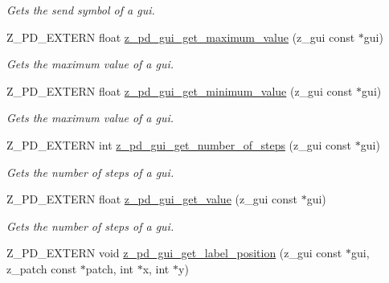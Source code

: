 \begin{DoxyCompactItemize}
\begin{DoxyCompactList}\small\item\em Gets the send symbol of a gui. \end{DoxyCompactList}\item 
\hypertarget{group__zpd_ga71da0fa29b26499035d85b6fde603cc5}{Z\-\_\-\-P\-D\-\_\-\-E\-X\-T\-E\-R\-N float \hyperlink{group__zpd_ga71da0fa29b26499035d85b6fde603cc5}{z\-\_\-pd\-\_\-gui\-\_\-get\-\_\-maximum\-\_\-value} (z\-\_\-gui const $\ast$gui)}\label{group__zpd_ga71da0fa29b26499035d85b6fde603cc5}

\begin{DoxyCompactList}\small\item\em Gets the maximum value of a gui. \end{DoxyCompactList}\item 
\hypertarget{group__zpd_ga1853ca4a1c4d138077c3dd6e027a018f}{Z\-\_\-\-P\-D\-\_\-\-E\-X\-T\-E\-R\-N float \hyperlink{group__zpd_ga1853ca4a1c4d138077c3dd6e027a018f}{z\-\_\-pd\-\_\-gui\-\_\-get\-\_\-minimum\-\_\-value} (z\-\_\-gui const $\ast$gui)}\label{group__zpd_ga1853ca4a1c4d138077c3dd6e027a018f}

\begin{DoxyCompactList}\small\item\em Gets the maximum value of a gui. \end{DoxyCompactList}\item 
\hypertarget{group__zpd_gaaa90f67c353248e4fce177b5a6826681}{Z\-\_\-\-P\-D\-\_\-\-E\-X\-T\-E\-R\-N int \hyperlink{group__zpd_gaaa90f67c353248e4fce177b5a6826681}{z\-\_\-pd\-\_\-gui\-\_\-get\-\_\-number\-\_\-of\-\_\-steps} (z\-\_\-gui const $\ast$gui)}\label{group__zpd_gaaa90f67c353248e4fce177b5a6826681}

\begin{DoxyCompactList}\small\item\em Gets the number of steps of a gui. \end{DoxyCompactList}\item 
\hypertarget{group__zpd_ga397470052fbb621060f8db704636b4fd}{Z\-\_\-\-P\-D\-\_\-\-E\-X\-T\-E\-R\-N float \hyperlink{group__zpd_ga397470052fbb621060f8db704636b4fd}{z\-\_\-pd\-\_\-gui\-\_\-get\-\_\-value} (z\-\_\-gui const $\ast$gui)}\label{group__zpd_ga397470052fbb621060f8db704636b4fd}

\begin{DoxyCompactList}\small\item\em Gets the number of steps of a gui. \end{DoxyCompactList}\item 
\hypertarget{group__zpd_ga47a7565e89cb9c0c05ca81db7feb2197}{Z\-\_\-\-P\-D\-\_\-\-E\-X\-T\-E\-R\-N void \hyperlink{group__zpd_ga47a7565e89cb9c0c05ca81db7feb2197}{z\-\_\-pd\-\_\-gui\-\_\-get\-\_\-label\-\_\-position} (z\-\_\-gui const $\ast$gui, z\-\_\-patch const $\ast$patch, int $\ast$x, int $\ast$y)}\label{group__zpd_ga47a7565e89cb9c0c05ca81db7feb2197}


\end{DoxyCompactItemize}
